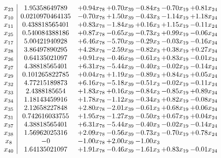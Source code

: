 \documentclass[8pt]{article}
\begin{document}
\[\begin{array}{c| c c@{\hskip 2pt} c@{\hskip 2pt} c@{\hskip 2pt} c@{\hskip 2pt} c@{\hskip 2pt} }
 x_{23}   &  1.95358649789 & +  0.94 x_{78} & +  0.70 x_{39} & -0.84 x_{3} & -0.70 x_{19} & +  0.81 x_{24}\\
 x_{10}   &  0.0210970464135 & -0.70 x_{78} & +  1.50 x_{39} & -0.43 x_{3} & -1.14 x_{19} & +  1.18 x_{24}\\
 x_{11}   &  0.438818565401 & +  0.83 x_{78} & -1.84 x_{39} & +  0.16 x_{3} & +  1.15 x_{19} & -0.11 x_{24}\\
 x_{25}   &  0.540084388186 & +  0.87 x_{78} & -0.65 x_{39} & -0.73 x_{3} & +  0.99 x_{19} & -0.06 x_{24}\\
 x_{17}   &  5.00421940928 & +  6.46 x_{78} & -5.70 x_{39} & -0.29 x_{3} & -0.03 x_{19} & -0.16 x_{24}\\
 x_{28}   &  3.86497890295 & +  4.28 x_{78} & -2.59 x_{39} & -0.82 x_{3} & +  0.38 x_{19} & +  0.27 x_{24}\\
 x_{26}   &  0.64135021097 & +  0.91 x_{78} & -0.46 x_{39} & -0.61 x_{3} & +  0.83 x_{19} & -0.01 x_{24}\\
 x_{27}   &  4.38818565401 & +  6.31 x_{78} & -5.44 x_{39} & -0.40 x_{3} & -0.02 x_{19} & -0.14 x_{24}\\
 x_{29}   &  0.101265822785 & +  0.04 x_{78} & +  1.19 x_{39} & -0.89 x_{3} & +  0.84 x_{19} & +  0.05 x_{24}\\
 x_{32}   &  4.77215189873 & +  6.16 x_{78} & -5.18 x_{39} & -0.51 x_{3} & -0.02 x_{19} & -0.11 x_{24}\\
 x_{33}   &  2.4388185654 & +  1.83 x_{78} & +  0.16 x_{39} & -0.84 x_{3} & -0.85 x_{19} & +  0.89 x_{24}\\
 x_{34}   &  1.18143459916 & +  1.78 x_{78} & -1.12 x_{39} & -0.34 x_{3} & +  0.82 x_{19} & -0.08 x_{24}\\
 x_{35}   &  2.12658227848 & +  2.80 x_{78} & -2.01 x_{39} & -0.61 x_{3} & +  0.68 x_{19} & +  0.06 x_{24}\\
 x_{31}   &  0.742616033755 & +  1.95 x_{78} & -1.27 x_{39} & -0.50 x_{3} & +  0.67 x_{19} & +  0.04 x_{24}\\
 x_{37}   &  4.38818565401 & +  6.31 x_{78} & -5.44 x_{39} & -0.40 x_{3} & -0.02 x_{19} & -0.14 x_{24}\\
 x_{38}   &  1.56962025316 & +  2.09 x_{78} & -0.56 x_{39} & -0.73 x_{3} & -0.70 x_{19} & +  0.78 x_{24}\\
 x_{8}   &  -0 & -1.00 x_{78} & +  2.00 x_{39} & -1.00 x_{3} &    &   \\
 x_{40}   &  1.64135021097 & +  1.91 x_{78} & -0.46 x_{39} & -1.61 x_{3} & +  0.83 x_{19} & -0.01 x_{24}\\

\end{array}\]
\end{document}
